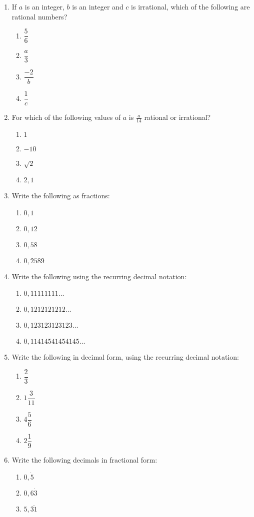 \begin{exercises}{}
{\begin{enumerate}[itemsep=5pt, label=\textbf{\arabic*}. ]
\item If $a$ is an integer, $b$ is an integer and $c$ is irrational, which of the following are rational numbers? 
  \begin{enumerate}[itemsep=5pt, label=\textbf{(\alph*)} ] 
    \item $\dfrac{5}{6}$
    \item $\dfrac{a}{3}$
    \item $\dfrac{-2}{b}$
    \item $\dfrac{1}{c}$
    \end{enumerate}
\item For which of the following values of $a$ is $\frac{a}{14}$ rational or irrational?
    \begin{enumerate}[itemsep=0pt, label=\textbf{(\alph*)} ] 
    \item $1$
    \item $-10$
    \item $\sqrt{2}$
    \item $2,1$
    \end{enumerate}
\item Write the following as fractions:
    \begin{enumerate}[itemsep=0pt, label=\textbf{(\alph*)} ] 
    \item $0,1$
    \item $0,12$
    \item $0,58$
    \item $0,2589$
    \end{enumerate}
\item Write the following using the recurring decimal notation:
    \begin{enumerate}[itemsep=0pt, label=\textbf{(\alph*)} ] 
    \item $0,11111111\ldots$
    \item $0,1212121212\ldots$
    \item $0,123123123123\ldots$
    \item $0,11414541454145\ldots$
    \end{enumerate}
\item Write the following in decimal form, using the recurring decimal notation:
    \begin{enumerate}[itemsep=5pt, label=\textbf{(\alph*)} ] 
    \item $\dfrac{2}{3}$
    \item $1\dfrac{3}{11}$
    \item $4\dfrac{5}{6}$
    \item $2\dfrac{1}{9}$
    \end{enumerate}
\item Write the following decimals in fractional form:
    \begin{enumerate}[itemsep=2pt, label=\textbf{(\alph*)} ] 
    \item $0,\dot{5}$
    \item $0,6\dot{3}$
    \item $5,\overline{31}$
    \end{enumerate}
\end{enumerate}
}
\end{exercises}


